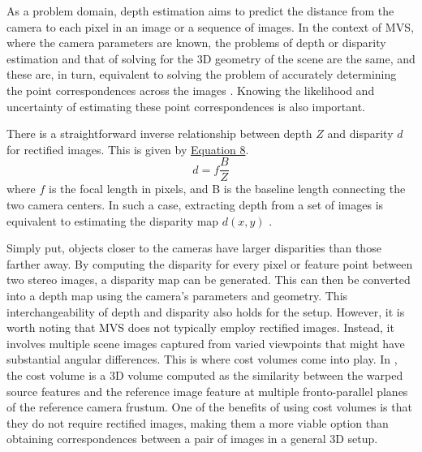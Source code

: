 As a problem domain, depth estimation aims to predict the distance from the camera to each pixel in an image or a sequence of images. In the context of MVS, where the camera parameters are known, the problems of depth or disparity estimation and that of solving for the 3D geometry of the scene are the same, and these are, in turn, equivalent to solving the problem of accurately determining the point correspondences across the images \cite{Furukawa2015}. Knowing the likelihood and uncertainty of estimating these point correspondences is also important. \par
There is a straightforward inverse relationship between depth $Z$ and disparity $d$ for rectified images. This is given by \hyperref[eq:depth-disp]{Equation 8}. \cite{Szeliski2010book, Okutomi1993}
\begin{equation}
    d = f\frac{B}{Z}
\end{equation}\label{eq:depth-disp}
where $f$ is the focal length in pixels, and B is the baseline length connecting the two camera centers. In such a case, extracting depth from a set of images is equivalent to estimating the disparity map $d(x, y)$ \cite{Szeliski2010book}.\par
Simply put, objects closer to the cameras have larger disparities than those farther away. By computing the disparity for every pixel or feature point between two stereo images, a disparity map can be generated. This can then be converted into a depth map using the camera's parameters and geometry. This interchangeability of depth and disparity also holds for the {\mvs} setup. However, it is worth noting that MVS does not typically employ rectified images. Instead, it involves multiple scene images captured from varied viewpoints that might have substantial angular differences. This is where cost volumes come into play. In {\mvs}, the cost volume is a 3D volume computed as the similarity between the warped source features and the reference image feature at multiple fronto-parallel planes of the reference camera frustum. One of the benefits of using cost volumes is that they do not require rectified images, making them a more viable option than obtaining correspondences between a pair of images in a general 3D setup. \par

